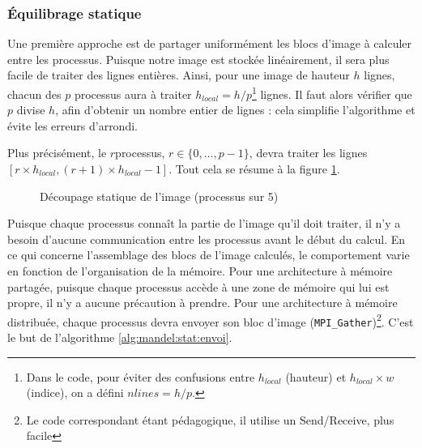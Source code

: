 \subsubsection{Équilibrage statique}

Une première approche est de partager uniformément les blocs d'image à
calculer entre les processus. Puisque notre image est stockée
linéairement, il sera plus facile de traiter des lignes
entières. Ainsi, pour une image de hauteur $h$ lignes, chacun des $p$
processus aura à traiter $h_{local} = h / p$\footnote{Dans le code,
  pour éviter des confusions entre $h_{local}$ (hauteur) et
  $h_{local} \times w$ (indice), on a défini $nlines = h / p$.}
lignes. Il faut alors vérifier que $p$ divise $h$, afin d'obtenir un
nombre entier de lignes : cela simplifie l'algorithme et évite les
erreurs d'arrondi.

Plus précisément, le $r$\ieme processus, $r \in \{0, \ldots, p-1\}$,
devra traiter les lignes
$[ r \times h_{local}, (r+1) \times h_{local} -1 ]$. Tout cela se
résume à la figure \ref{fig:mandel:decoupage-statique}.

\begin{figure}[h]
  \centering
  
  
  \caption{Découpage statique de l'image (processus  sur 5)}
  \label{fig:mandel:decoupage-statique}
\end{figure}

Puisque chaque processus connaît la partie de l'image qu'il doit
traiter, il n'y a besoin d'aucune communication entre les processus
avant le début du calcul. En ce qui concerne l'assemblage des blocs de
l'image calculés, le comportement varie en fonction de l'organisation
de la mémoire. Pour une architecture à mémoire partagée, puisque
chaque processus accède à une zone de mémoire qui lui est propre, il
n'y a aucune précaution à prendre. Pour une architecture à mémoire
distribuée, chaque processus devra envoyer son bloc d'image
(\texttt{MPI\_Gather})\footnote{Le code correspondant étant pédagogique,
  il utilise un Send/Receive, plus facile}. C'est le but de
l'algorithme \ref{alg:mandel:stat:envoi}.

